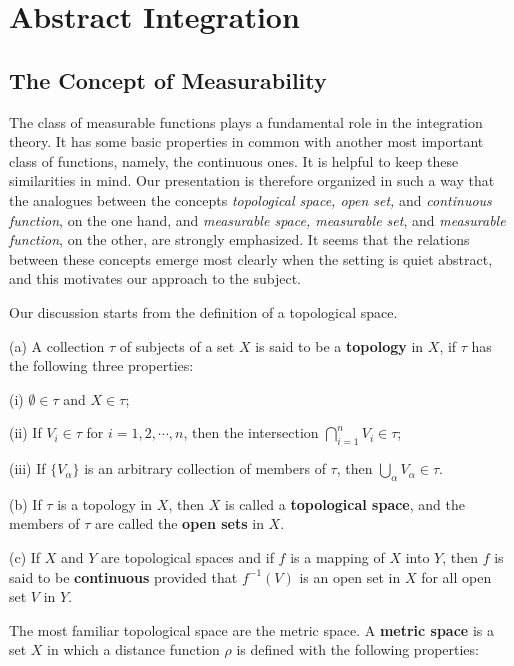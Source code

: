 \section{Abstract Integration}
\subsection{The Concept of Measurability}
The class of measurable functions plays a fundamental role in the integration theory. It has some basic properties in common with another most important class of functions, namely, the continuous ones. It is helpful to keep these similarities in mind. Our presentation is therefore organized in such a way that the analogues between the concepts \textit{topological space, open set,} and \textit{continuous function}, on the one hand, and \textit{measurable space, measurable set}, and \textit{measurable function}, on the other, are strongly emphasized. It seems that the relations between these concepts emerge most clearly when the setting is quiet abstract, and this motivates our approach to the subject.\par
Our discussion starts from the definition of a topological space.
\begin{definition}
(a) A collection $\tau$ of subjects of a set $X$ is said to be a \textbf{topology} in $X$, if $\tau$ has the following three properties:\par
\hspace{0.5cm}(i) $\emptyset\in\tau$ and $X\in\tau$;\par
\hspace{0.5cm}(ii) If $V_i\in\tau$ for $i=1,2,\cdots,n$, then the intersection $\bigcap_{i=1}^nV_i\in\tau$;\par
\hspace{0.5cm}(iii) If $\{V_\alpha\}$ is an arbitrary collection of members of $\tau$, then $\bigcup_{\alpha}V_\alpha\in\tau$.\par
(b) If $\tau$ is a topology in $X$, then $X$ is called a \textbf{topological space}, and the members of $\tau$ are called the \textbf{open sets} in $X$.\par
(c) If $X$ and $Y$ are topological spaces and if $f$ is a mapping of $X$ into $Y$, then $f$ is said to be \textbf{continuous} provided that $f^{-1}(V)$ is an open set in $X$ for all open set $V$ in $Y$.
\end{definition}
The most familiar topological space are the metric space. A \textbf{metric space} is a set $X$ in which a distance function $\rho$ is defined with the following properties:\par
